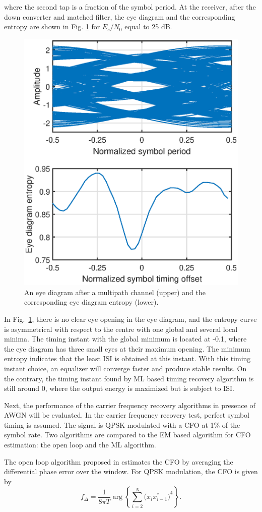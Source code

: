 \documentclass[journal,comsoc,onecolumn, 12pt,draftclsnofoot]{IEEEtran}
\begin{document}
\noindent where the second tap is a fraction of the symbol period.  
At the receiver, after the down converter and matched filter, the eye diagram and the corresponding entropy are shown in Fig. \ref{fig:per_timing_isi} for \(E_s/N_0\) equal to 25 dB. 
\begin{figure}[ht]
\centering
\includegraphics[width=3 in]{pic/per_timing_multi.eps}
\caption{An eye diagram after a multipath channel (upper) and the corresponding eye diagram entropy (lower).}
\label{fig:per_timing_isi} 
\end{figure} 

In Fig.~\ref{fig:per_timing_isi}, there is no clear eye opening in the eye diagram, and the entropy curve is asymmetrical with respect to the centre with one global and several local minima. 
The timing instant with the global minimum is located at -0.1, where the eye diagram has three small eyes at their maximum opening.
The minimum entropy indicates that the least ISI is obtained at this instant.
With this timing instant choice, an equalizer will converge faster and produce stable results.
On the contrary, the timing instant found by ML based timing recovery algorithm is still around 0, 
where the output energy is maximized but is subject to ISI.

Next, the performance of the carrier frequency recovery algorithms in presence of AWGN will be evaluated.
In the carrier frequency recovery test, perfect symbol timing is assumed.
The signal is QPSK modulated with a CFO at 1\% of the symbol rate.
Two algorithms are compared to the EM based algorithm for CFO estimation:
the open loop and the ML algorithm.

The open loop algorithm proposed in \cite{Chuang1991} estimates the CFO  by averaging the differential phase error over the window.
For QPSK modulation, the CFO is given by \cite{mengali1997synchronization}
\begin{equation}
f_\Delta = \frac{1}{8 \pi T} \arg \left\{ {\sum\limits_{i = 2}^{{N} } {{{\big( {x_i x^*_{i-1}} \big)}^4}} } \right\}.
\label{eq:freq_openloop}
\end{equation}
\end{document}
